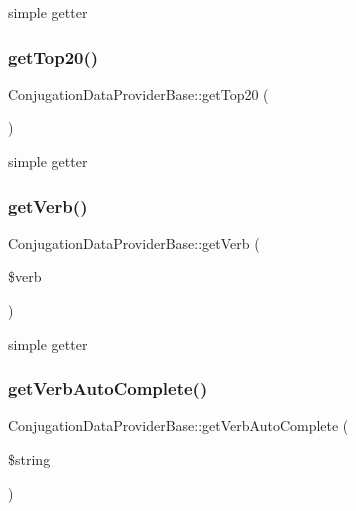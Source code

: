 simple getter \hypertarget{classConjugationDataProviderBase_aafcbd6631477f8f634d762b5ba5dc217}{}\label{classConjugationDataProviderBase_aafcbd6631477f8f634d762b5ba5dc217} 
\subsubsection{\texorpdfstring{get\+Top20()}{getTop20()}}
{\footnotesize\ttfamily Conjugation\+Data\+Provider\+Base\+::get\+Top20 (\begin{DoxyParamCaption}{ }\end{DoxyParamCaption})\hspace{0.3cm}{\ttfamily [abstract]}}

simple getter \hypertarget{classConjugationDataProviderBase_a45ac93643d08f3099bf95faa22e9ba55}{}\label{classConjugationDataProviderBase_a45ac93643d08f3099bf95faa22e9ba55} 
\subsubsection{\texorpdfstring{get\+Verb()}{getVerb()}}
{\footnotesize\ttfamily Conjugation\+Data\+Provider\+Base\+::get\+Verb (\begin{DoxyParamCaption}\item[{}]{\$verb }\end{DoxyParamCaption})\hspace{0.3cm}{\ttfamily [abstract]}}

simple getter \hypertarget{classConjugationDataProviderBase_a517127918e71fd89e1b7717c26353f87}{}\label{classConjugationDataProviderBase_a517127918e71fd89e1b7717c26353f87} 
\subsubsection{\texorpdfstring{get\+Verb\+Auto\+Complete()}{getVerbAutoComplete()}}
{\footnotesize\ttfamily Conjugation\+Data\+Provider\+Base\+::get\+Verb\+Auto\+Complete (\begin{DoxyParamCaption}\item[{}]{\$string }\end{DoxyParamCaption})\hspace{0.3cm}{\ttfamily [abstract]}}

